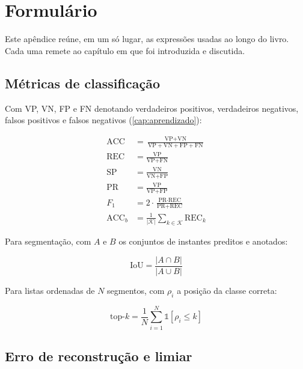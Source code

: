\chapter{Formulário}
\label{cap:formulario}

Este apêndice reúne, em um só lugar, as expressões usadas ao longo do livro. Cada uma
remete ao capítulo em que foi introduzida e discutida.

\section{Métricas de classificação}

Com VP, VN, FP e FN denotando verdadeiros positivos, verdadeiros negativos, falsos
positivos e falsos negativos (\cref{cap:aprendizado}):

\begin{align}
\text{ACC} &= \frac{\text{VP} + \text{VN}}{\text{VP} + \text{VN} + \text{FP} + \text{FN}}
\label{eq:for-acc} \\[0.4em]
\text{REC} &= \frac{\text{VP}}{\text{VP} + \text{FN}}
\label{eq:for-rec} \\[0.4em]
\text{SP} &= \frac{\text{VN}}{\text{VN} + \text{FP}}
\label{eq:for-sp} \\[0.4em]
\text{PR} &= \frac{\text{VP}}{\text{VP} + \text{FP}}
\label{eq:for-pr} \\[0.4em]
F_1 &= 2 \cdot \frac{\text{PR} \cdot \text{REC}}{\text{PR} + \text{REC}}
\label{eq:for-f1} \\[0.4em]
\text{ACC}_b &= \frac{1}{|\mathcal{K}|} \sum_{k \in \mathcal{K}} \text{REC}_k
\label{eq:for-accb}
\end{align}

Para segmentação, com $A$ e $B$ os conjuntos de instantes preditos e anotados:

\begin{equation}
\text{IoU} = \frac{|A \cap B|}{|A \cup B|}
\label{eq:for-iou}
\end{equation}

Para listas ordenadas de $N$ segmentos, com $\rho_i$ a posição da classe correta:

\begin{equation}
\text{top-}k = \frac{1}{N} \sum_{i=1}^{N} \mathbb{1}[\rho_i \le k]
\label{eq:for-topk}
\end{equation}

\section{Erro de reconstrução e limiar}

